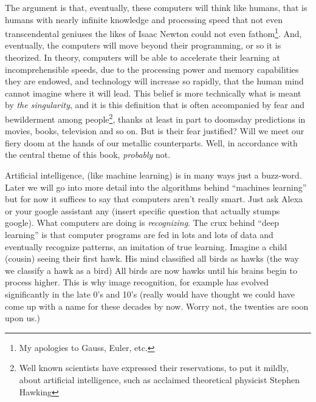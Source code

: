 \documentclass[12pt,twoside]{book}
\begin{document}
	The argument is that, eventually, these computers will think like humans, that is humans with nearly infinite knowledge and processing speed that not even transcendental geniuses the likes of Isaac Newton could not even fathom\footnote{My apologies to Gauss, Euler, etc.}. And, eventually, the computers will move beyond their programming, or so it is theorized. In theory, computers will be able to accelerate their learning at incomprehensible speeds, due to the processing power and memory capabilities they are endowed, and technology will increase so rapidly, that the human mind cannot imagine where it will lead.  This belief is more technically what is meant by \emph{the singularity}, and it is this definition that is often accompanied by fear and bewilderment among people\footnote{Well known scientists have expressed their reservations, to put it mildly, about artificial intelligence, such as acclaimed theoretical physicist Stephen Hawking}, thanks at least in part to doomsday predictions in movies, books, television and so on. But is their fear justified?  Will we meet our fiery doom at the hands of our metallic counterparts.  Well, in accordance with the central theme of this book, \emph{probably} not.  
	
	Artificial intelligence, (like machine learning) is in many ways just a buzz-word.  Later we will go into more detail into the algorithms behind ``machines learning'' but for now it suffices to say that computers aren't really smart.  Just ask Alexa or your google assistant any (insert specific question that actually stumps google).  What computers are doing is \emph{recognizing}. The crux behind ``deep learning'' is that computer programs are fed in lots and lots of data and eventually recognize patterns, an imitation of true learning.  Imagine a child (cousin) seeing their first hawk.  His mind classified all birds as hawks (the way we classify a hawk as a bird)  All birds are now hawks until his brains begin to process higher. This is why image recognition, for example has evolved significantly in the late 0's and 10's (really would have thought we could have come up with a name for these decades by now.  Worry not, the twenties are soon upon us.)  
	
\end{document}
